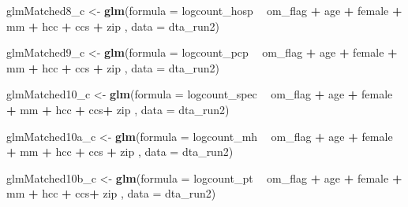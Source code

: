\documentclass[]{article}
\newenvironment{Shaded}{\begin{snugshade}}{\end{snugshade}}
\newcommand{\KeywordTok}[1]{\textcolor[rgb]{0.13,0.29,0.53}{\textbf{#1}}}
\newcommand{\DataTypeTok}[1]{\textcolor[rgb]{0.13,0.29,0.53}{#1}}
\newcommand{\StringTok}[1]{\textcolor[rgb]{0.31,0.60,0.02}{#1}}
\newcommand{\OperatorTok}[1]{\textcolor[rgb]{0.81,0.36,0.00}{\textbf{#1}}}
\newcommand{\NormalTok}[1]{#1}
\begin{document}
\begin{Shaded}
\begin{Highlighting}[]
\NormalTok{glmMatched8_c <-}\StringTok{ }\KeywordTok{glm}\NormalTok{(}\DataTypeTok{formula =}\NormalTok{ logcount_hosp }\OperatorTok{~}\StringTok{ }\NormalTok{om_flag }\OperatorTok{+}\StringTok{ }\NormalTok{age }\OperatorTok{+}\StringTok{ }\NormalTok{female }\OperatorTok{+}\StringTok{ }\NormalTok{mm }\OperatorTok{+}\StringTok{ }\NormalTok{hcc }\OperatorTok{+}\StringTok{ }\NormalTok{ccs }\OperatorTok{+}\StringTok{ }\NormalTok{zip ,}
                   \DataTypeTok{data    =}\NormalTok{ dta_run2)}


\NormalTok{glmMatched9_c <-}\StringTok{ }\KeywordTok{glm}\NormalTok{(}\DataTypeTok{formula =}\NormalTok{ logcount_pcp }\OperatorTok{~}\StringTok{ }\NormalTok{om_flag }\OperatorTok{+}\StringTok{ }\NormalTok{age }\OperatorTok{+}\StringTok{ }\NormalTok{female }\OperatorTok{+}\StringTok{ }\NormalTok{mm }\OperatorTok{+}\StringTok{ }\NormalTok{hcc }\OperatorTok{+}\StringTok{ }\NormalTok{ccs }\OperatorTok{+}\StringTok{ }\NormalTok{zip ,}
                   \DataTypeTok{data    =}\NormalTok{ dta_run2)}

\NormalTok{glmMatched10_c <-}\StringTok{ }\KeywordTok{glm}\NormalTok{(}\DataTypeTok{formula =}\NormalTok{ logcount_spec }\OperatorTok{~}\StringTok{ }\NormalTok{om_flag }\OperatorTok{+}\StringTok{ }\NormalTok{age }\OperatorTok{+}\StringTok{ }\NormalTok{female }\OperatorTok{+}\StringTok{ }\NormalTok{mm }\OperatorTok{+}\StringTok{ }\NormalTok{hcc }\OperatorTok{+}\StringTok{ }\NormalTok{ccs}\OperatorTok{+}\StringTok{ }\NormalTok{zip  ,}
                    \DataTypeTok{data    =}\NormalTok{ dta_run2)}



\NormalTok{glmMatched10a_c <-}\StringTok{ }\KeywordTok{glm}\NormalTok{(}\DataTypeTok{formula =}\NormalTok{ logcount_mh }\OperatorTok{~}\StringTok{ }\NormalTok{om_flag }\OperatorTok{+}\StringTok{ }\NormalTok{age }\OperatorTok{+}\StringTok{ }\NormalTok{female }\OperatorTok{+}\StringTok{ }\NormalTok{mm }\OperatorTok{+}\StringTok{ }\NormalTok{hcc }\OperatorTok{+}\StringTok{ }\NormalTok{ccs }\OperatorTok{+}\StringTok{ }\NormalTok{zip ,}
                     \DataTypeTok{data    =}\NormalTok{ dta_run2)}



\NormalTok{glmMatched10b_c <-}\StringTok{ }\KeywordTok{glm}\NormalTok{(}\DataTypeTok{formula =}\NormalTok{ logcount_pt }\OperatorTok{~}\StringTok{ }\NormalTok{om_flag }\OperatorTok{+}\StringTok{ }\NormalTok{age }\OperatorTok{+}\StringTok{ }\NormalTok{female }\OperatorTok{+}\StringTok{ }\NormalTok{mm }\OperatorTok{+}\StringTok{ }\NormalTok{hcc }\OperatorTok{+}\StringTok{ }\NormalTok{ccs}\OperatorTok{+}\StringTok{ }\NormalTok{zip  ,}
                     \DataTypeTok{data    =}\NormalTok{ dta_run2)}



\end{Highlighting}
\end{Shaded}
\end{document}

